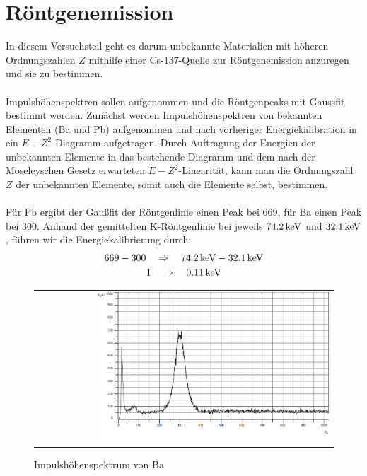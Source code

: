 \documentclass[a4paper,titlepage]{scrartcl}
\numberwithin{equation}{section}
\begin{document}
\section{Röntgenemission}
In diesem Versuchsteil geht es darum unbekannte Materialien mit höheren Ordnungszahlen $Z$ mithilfe einer Cs-137-Quelle zur Röntgenemission anzuregen und sie zu bestimmen.\\ \\
Impulshöhenspektren sollen aufgenommen und die Röntgenpeaks mit Gaussfit bestimmt werden. Zunächst werden Impulshöhenspektren von bekannten Elementen (Ba und Pb) aufgenommen und nach vorheriger Energiekalibration in ein $E-Z^2$-Diagramm aufgetragen. Durch Auftragung der Energien der unbekannten Elemente in das bestehende Diagramm und dem nach der Moseleyschen Gesetz erwarteten $E-Z^2$-Linearität, kann man die Ordnungszahl $Z$ der unbekannten Elemente, somit auch die Elemente selbst, bestimmen.\\ \\
Für Pb ergibt der Gaußfit der Röntgenlinie einen Peak bei 669, für Ba einen Peak bei 300. Anhand der gemittelten K-Röntgenlinie bei jeweils $\unit[74.2]{keV}$ und $\unit[32.1]{keV}$, führen wir die Energiekalibrierung durch:
\begin{gather*}
669 - 300 \quad \Rightarrow \quad \unit[74.2]{keV}-\unit[32.1]{keV}\\
1 \quad \Rightarrow \quad \unit[0.11]{keV}
\end{gather*}
\begin{figure}[H]
		\centering
		\begin{tabular}{@{}r@{}}
			\includegraphics[width=0.8\textwidth]{bilder/aufgabe3/ba.png}\\
		\end{tabular}
		\caption{Impulshöhenspektrum von Ba}
\end{figure}
\end{document}
